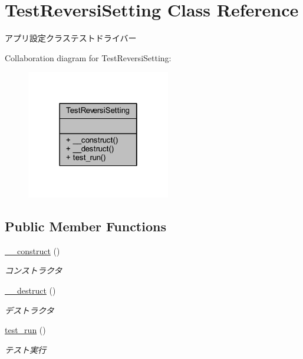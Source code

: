 \hypertarget{class_test_reversi_setting}{}\section{Test\+Reversi\+Setting Class Reference}
\label{class_test_reversi_setting}


アプリ設定クラステストドライバー  




Collaboration diagram for Test\+Reversi\+Setting\+:\nopagebreak
\begin{figure}[H]
\begin{center}
\leavevmode
\includegraphics[width=178pt]{class_test_reversi_setting__coll__graph}
\end{center}
\end{figure}
\subsection*{Public Member Functions}
\begin{DoxyCompactItemize}
\item 
\hyperlink{class_test_reversi_setting_a095c5d389db211932136b53f25f39685}{\+\_\+\+\_\+construct} ()
\begin{DoxyCompactList}\small\item\em コンストラクタ \end{DoxyCompactList}\item 
\hyperlink{class_test_reversi_setting_a421831a265621325e1fdd19aace0c758}{\+\_\+\+\_\+destruct} ()
\begin{DoxyCompactList}\small\item\em デストラクタ \end{DoxyCompactList}\item 
\hyperlink{class_test_reversi_setting_a9b029832cfdf19c0ef36b1f5ef7b7735}{test\+\_\+run} ()
\begin{DoxyCompactList}\small\item\em テスト実行 \end{DoxyCompactList}\end{DoxyCompactItemize}


